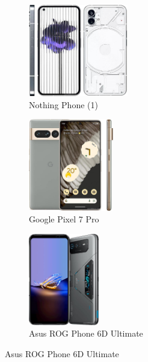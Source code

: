 \documentclass[answers, 10pt, UKenglish]{exam}
\begin{document}
\begin{figure}[htpb]
	\begin{subfigure}[htpb]{0.25\linewidth}
	\begin{center}
		\includegraphics[width=\linewidth,height=4cm,keepaspectratio]{nothing-phone-1}
	\end{center}
	\caption{Nothing Phone (1)}
	\label{fig:nothing-phone-1}
	\end{subfigure}
	\begin{subfigure}[htpb]{0.25\linewidth}
	\begin{center}
		\includegraphics[width=\linewidth,height=4cm,keepaspectratio]{google-pixel-7-pro}
	\end{center}
	\caption{Google Pixel 7 Pro}
	\label{fig:google-pixel-7-pro}
	\end{subfigure}
	\begin{subfigure}[htpb]{0.25\linewidth}
	\begin{center}
		\includegraphics[width=\linewidth,height=4cm,keepaspectratio]{asus-rog-phone-6d-ultimate}
	\end{center}
	\caption{Asus ROG Phone 6D Ultimate}
	\label{fig:asus-rog-phone-6d-ultimate}
	\end{subfigure}


\end{figure}
\end{document}
